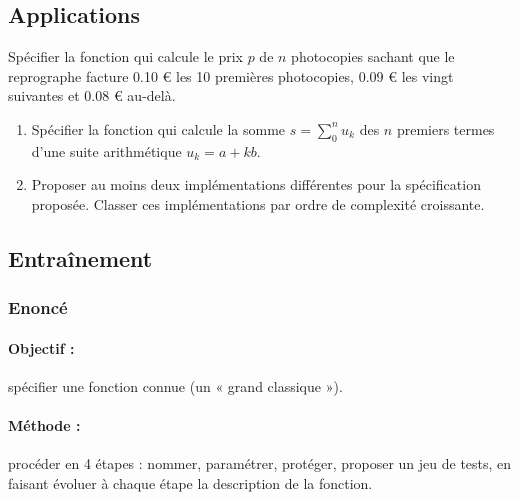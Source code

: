 \subsection{Applications}
\begin{question}\mbox{}
Spécifier la fonction qui calcule le prix $p$ de $n$ photocopies sachant que le reprographe
facture 0.10 \euro{} les 10 premières photocopies, 0.09 \euro{} les vingt suivantes et 0.08 \euro{} au-delà.
\end{question}

\begin{question}\mbox{}
\begin{enumerate}
\item Spécifier la fonction qui calcule la somme $s = \sum_0^n u_k$ des $n$ premiers termes d'une suite arithmétique $u_k = a + kb$.
\item Proposer au moins deux implémentations différentes pour la spécification proposée.
	Classer ces implémentations par ordre de complexité croissante.
\end{enumerate}
\end{question}

\subsection{Entraînement}

\subsubsection{Enoncé}

\paragraph{Objectif :} spécifier une fonction connue (un « grand classique »).

\paragraph{Méthode :} procéder en 4 étapes : nommer, paramétrer, protéger, 
proposer un jeu de tests, en faisant évoluer à chaque étape la description 
de la fonction.

